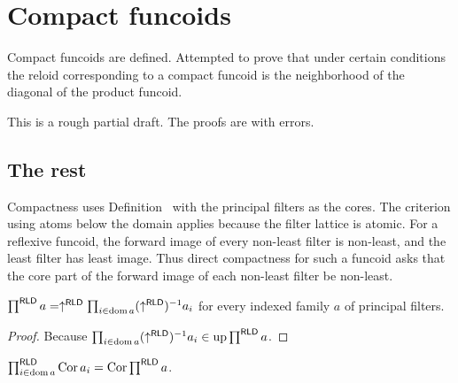 \chapter{Compact funcoids}

Compact funcoids are defined. Attempted to prove that under certain conditions the
reloid corresponding to a compact funcoid is the neighborhood of the diagonal
of the product funcoid.

This is a rough partial draft. The proofs are with errors.


\section{The rest}

Compactness uses Definition~ with
the principal filters as the cores. The criterion using atoms
below the domain applies because the filter lattice is atomic.
For a reflexive funcoid, the forward image of every non-least
filter is non-least, and the least filter has least image.
Thus direct compactness for such a funcoid asks that the core
part of the forward image of each non-least filter be non-least.

\begin{prop}
  $\prod^{\mathsf{RLD}} a = \uparrow^{\mathsf{RLD}} \prod_{i \in
  \operatorname{dom} a} (\uparrow^{\mathsf{RLD}})^{- 1} a_i$ for every indexed
  family $a$ of principal filters.
\end{prop}

\begin{proof}
Because $\prod_{i \in \operatorname{dom} a} (\uparrow^{\mathsf{RLD}})^{- 1} a_i
\in \operatorname{up} \prod^{\mathsf{RLD}} a$.
\end{proof}

\begin{lem}
$\prod^{\mathsf{RLD}}_{i \in \operatorname{dom} a} \operatorname{Cor} a_i = \operatorname{Cor}
\prod^{\mathsf{RLD}} a$.
\end{lem}

